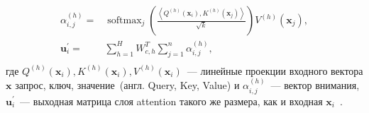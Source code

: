 \begin{equation}
\begin{aligned}
\alpha_{i,j}^{(h)}=&\operatorname{softmax}_j\left(\frac{\left\langle Q^{(h)}\left(\mathbf{x}_i\right), K^{(h)}\left(\mathbf{x}_j\right)\right\rangle}{\sqrt{k}}\right)V^{(h)}\left(\mathbf{x}_j\right), \\
\mathbf{u}_i^{\prime}=&\sum_{h=1}^H W_{c, h}^T \sum_{j=1}^n \alpha_{i, j}^{(h)}, \\
\end{aligned}
\end{equation}
где $Q^{(h)}\left(\mathbf{x}_i\right), K^{(h)}\left(\mathbf{x}_i\right), V^{(h)}\left(\mathbf{x}_i\right)$~--- линейные проекции входного вектора $\mathbf{x}$ запрос, ключ, значение~(англ. Query, Key, Value) и $\alpha_{i,j}^{(h)}$~--- вектор внимания, $\mathbf{u}_i^{\prime}$~--- выходная матрица слоя attention такого же размера, как и входная $\mathbf{x}_i$~\cite{vaswani2017attention}.

